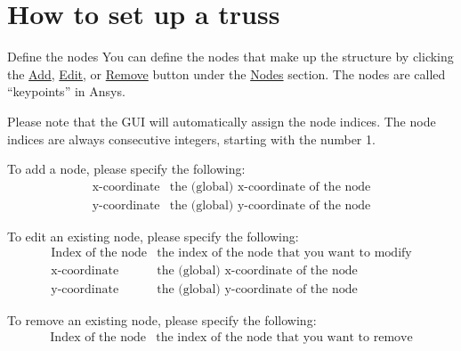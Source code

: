 \documentclass[oneside, english, reqno]{amsart}
\makeatletter
\theoremstyle{plain}
\theoremstyle{plain}
\theoremstyle{plain}
\theoremstyle{plain}
\theoremstyle{definition}
\theoremstyle{definition}
\theoremstyle{definition}
\def\subsection{\@startsection{subsection}{3}%
  \z@{2\linespacing}{.3\linespacing}%
  {\normalfont}}
\numberwithin{equation}{section}
\makeatother
\begin{document}
\section{How to set up a truss}
\label{sec:1}

\subsection{Define the nodes}
\label{sec:1.1}
You can define the nodes that make up the structure by clicking the \underline{Add}, \underline{Edit}, or \underline{Remove} button under the \underline{Nodes} section. The nodes are called ``keypoints'' in Ansys.

Please note that the GUI will automatically assign the node indices. The node indices are always consecutive integers, starting with the number 1. \vspace{20pt}

To add a node, please specify the following:
\begin{equation*}
		\begin{array}{ll}
				\mbox{x-coordinate} & \mbox{the (global) x-coordinate of the node} \\[6pt]
				\mbox{y-coordinate} & \mbox{the (global) y-coordinate of the node}
		\end{array}
\end{equation*} \vspace{10pt}

To edit an existing node, please specify the following:
\begin{equation*}
		\begin{array}{ll}
				\mbox{Index of the node} & \mbox{the index of the node that you want to modify} \\[8pt]
				\mbox{x-coordinate} & \mbox{the (global) x-coordinate of the node} \\[8pt]
				\mbox{y-coordinate} & \mbox{the (global) y-coordinate of the node}
		\end{array}
\end{equation*} \vspace{10pt}

To remove an existing node, please specify the following:
\begin{equation*}
		\begin{array}{ll}
				\mbox{Index of the node} & \mbox{the index of the node that you want to remove}
		\end{array}
\end{equation*} \vspace{1pt}
\end{document}
